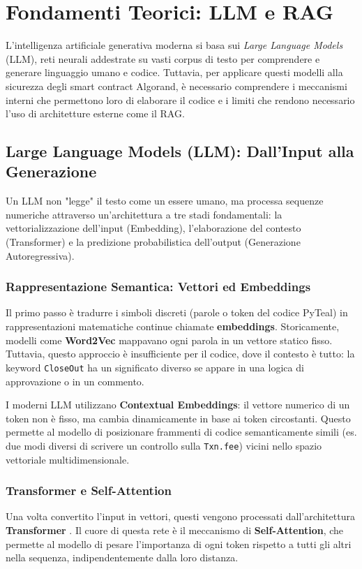 \section{Fondamenti Teorici: LLM e RAG}
\label{sec:llm_theory}

L'intelligenza artificiale generativa moderna si basa sui \textit{Large Language Models} (LLM), reti neurali addestrate su vasti corpus di testo per comprendere e generare linguaggio umano e codice. Tuttavia, per applicare questi modelli alla sicurezza degli smart contract Algorand, è necessario comprendere i meccanismi interni che permettono loro di elaborare il codice e i limiti che rendono necessario l'uso di architetture esterne come il RAG.

\subsection{Large Language Models (LLM): Dall'Input alla Generazione}
Un LLM non "legge" il testo come un essere umano, ma processa sequenze numeriche attraverso un'architettura a tre stadi fondamentali: la vettorializzazione dell'input (Embedding), l'elaborazione del contesto (Transformer) e la predizione probabilistica dell'output (Generazione Autoregressiva).

\subsubsection{Rappresentazione Semantica: Vettori ed Embeddings}
Il primo passo è tradurre i simboli discreti (parole o token del codice PyTeal) in rappresentazioni matematiche continue chiamate \textbf{embeddings}. 
Storicamente, modelli come \textbf{Word2Vec} \cite{mikolov2013efficient} mappavano ogni parola in un vettore statico fisso. Tuttavia, questo approccio è insufficiente per il codice, dove il contesto è tutto: la keyword \texttt{CloseOut} ha un significato diverso se appare in una logica di approvazione o in un commento.

I moderni LLM utilizzano \textbf{Contextual Embeddings}: il vettore numerico di un token non è fisso, ma cambia dinamicamente in base ai token circostanti. Questo permette al modello di posizionare frammenti di codice semanticamente simili (es. due modi diversi di scrivere un controllo sulla \texttt{Txn.fee}) vicini nello spazio vettoriale multidimensionale.

\subsubsection{Transformer e Self-Attention}
Una volta convertito l'input in vettori, questi vengono processati dall'architettura \textbf{Transformer} \cite{vaswani2017attention}. Il cuore di questa rete è il meccanismo di \textbf{Self-Attention}, che permette al modello di pesare l'importanza di ogni token rispetto a tutti gli altri nella sequenza, indipendentemente dalla loro distanza.

